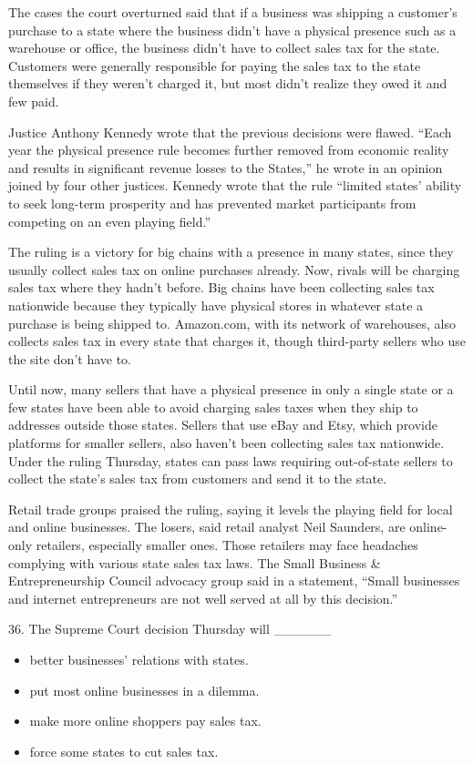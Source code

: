 \documentclass[UTF8,11pt]{ctexart}
\begin{document}
The cases the court overturned said that if a business was shipping a customer’s purchase to a state where the business didn’t have a physical presence such as a warehouse or office, the business didn’t have to collect sales tax for the state. Customers were generally responsible for paying the sales tax to the state themselves if they weren’t charged it, but most didn’t realize they owed it and few paid.


Justice Anthony Kennedy wrote that the previous decisions were flawed. “Each year the physical presence rule becomes further removed from economic reality and results in significant revenue losses to the States,” he wrote in an opinion joined by four other justices. Kennedy wrote that the rule “limited states’ ability to seek long-term prosperity and has prevented market participants from competing on an even playing field.”


The ruling is a victory for big chains with a presence in many states, since they usually collect sales tax on online purchases already. Now, rivals will be charging sales tax where they hadn’t before. Big chains have been collecting sales tax nationwide because they typically have physical stores in whatever state a purchase is being shipped to. Amazon.com, with its network of warehouses, also collects sales tax in every state that charges it, though third-party sellers who use the site don’t have to.


Until now, many sellers that have a physical presence in only a single state or a few states have been able to avoid charging sales taxes when they ship to addresses outside those states. Sellers that use eBay and Etsy, which provide platforms for smaller sellers, also haven’t been collecting sales tax nationwide. Under the ruling Thursday, states can pass laws requiring out-of-state sellers to collect the state’s sales tax from customers and send it to the state.


Retail trade groups praised the ruling, saying it levels the playing field for local and online businesses. The losers, said retail analyst Neil Saunders, are online-only retailers, especially smaller ones. Those retailers may face headaches complying with various state sales tax laws. The Small Business \& Entrepreneurship Council advocacy group said in a statement, “Small businesses and internet entrepreneurs are not well served at all by this decision.”


36. The Supreme Court decision Thursday will \_\_\_\_\_\_


\begin{itemize}[leftmargin=2em,itemsep=.2em,topsep=.4em]\item[A.] better businesses’ relations with states.
\item[B.] put most online businesses in a dilemma.
\item[C.] make more online shoppers pay sales tax.
\item[D.] force some states to cut sales tax.
\end{itemize}
\end{document}
